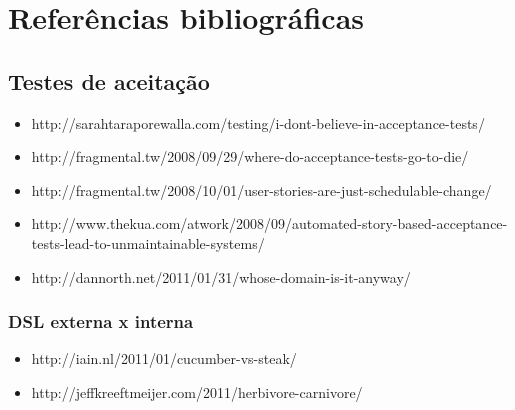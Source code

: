\chapter{Referências bibliográficas}

\section{Testes de aceitação}

\begin{itemize}
\item http://sarahtaraporewalla.com/testing/i-dont-believe-in-acceptance-tests/
\item http://fragmental.tw/2008/09/29/where-do-acceptance-tests-go-to-die/
\item http://fragmental.tw/2008/10/01/user-stories-are-just-schedulable-change/
\item http://www.thekua.com/atwork/2008/09/automated-story-based-acceptance-tests-lead-to-unmaintainable-systems/
\item http://dannorth.net/2011/01/31/whose-domain-is-it-anyway/
\end{itemize}

\subsection{DSL externa x interna}

\begin{itemize}
\item http://iain.nl/2011/01/cucumber-vs-steak/
\item http://jeffkreeftmeijer.com/2011/herbivore-carnivore/
\end{itemize}
